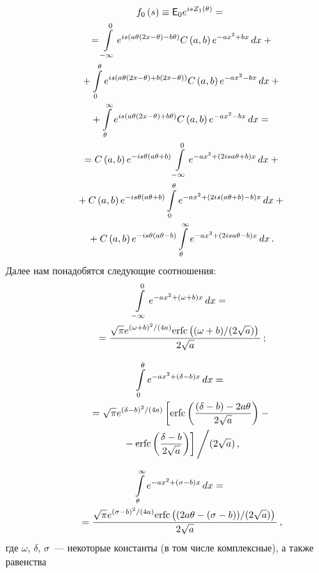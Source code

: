 \begin{multicols}{2}
\begin{multline}
f_{0} \left(s\right)\equiv
{{\sf E}}_{0}e^{isZ_{1}\left(\theta\right)}={}\\
{}= \int\limits_{-\infty}^{0}
e^{is\left(a\theta\left(2x-\theta\right)-b\theta\right)}
C\left(a,b\right)e^{-a x^{2}+bx}\,dx+{}\\
{}
+\int\limits_{0}^{\theta }e^{is\left(a\theta\left(2x
-\theta\right)+b\left(2x-\theta\right)\right)}
C\left(a,b\right)e^{-ax^{2}-bx}\,dx+{}\\
{}+
\int\limits_{\theta }^{\infty }e^{is\left(a\theta
\left(2x-\theta\right)+b\theta \right)}C\left(a,b\right)
e^{-ax^{2}-bx}\,dx={}\\
{}
=C\left(a,b\right)e^{-is\theta\left(a\theta+b\right)}
\int\limits_{-\infty }^{0}e^{-a x^{2}
+\left(2isa\theta+b\right)x}\,dx+{}\\
{}+C\left(a,b\right)
e^{-is\theta\left(a \theta+b\right)}\int\limits_{0}^{\theta }
e^{-a x^{2}+\left(2is\left(a\theta + b
\right)-b\right)x}\,dx+{}\\
{}
+C\left(a,b\right) e^{-is\theta\left(a\theta - b\right)}
\int\limits_{\theta }^{\infty } e^{-a x^{2}
+ \left(2isa\theta - b\right)x}\,dx\,.  
\label{e2.5}
\end{multline}
Далее нам понадобятся следующие соотношения:
\begin{multline}
\int\limits_{-\infty }^{0}e^{-a x^{2}+\left(\omega+b\right)x}\,dx={}\\
{}=
\displaystyle\frac{\displaystyle \sqrt{\pi }e^{\left(\omega+b\right)^{2}/(4a)}
{\mathrm{erfc}}\left((\omega+b)/(2\sqrt{a})\right)\mathstrut}{\displaystyle 2\sqrt{a}\mathstrut}\,; 
\label{e2.6}
\end{multline}
\vspace*{-6pt}

\noindent
\begin{multline}
\int\limits_{0}^{\theta }e^{-a x^{2}+\left(\delta-b\right)x}\,dx ={}\\
{}=
\sqrt{\pi}e^{\left(\delta-b\right)^{2}/(4a)}
\left[{\mathrm{erfc}}\left(\displaystyle\frac{\displaystyle \left(\delta
-b\right)-2a\theta \mathstrut}{\displaystyle {\rm 2}\sqrt{a}\mathstrut}\right)-{}\right.\\
\left.{}-{\mathrm{erfc}}\left(\displaystyle\frac{\displaystyle \delta-b\mathstrut}{\displaystyle {\rm 2}\sqrt{a}\mathstrut}
\right)\right]\Bigg /(2\sqrt{a})\,, \label{e2.7}
\end{multline}
\vspace*{-6pt}

\noindent
\begin{multline}
\int\limits_{\theta }^{\infty }e^{-ax^{2}+\left(\sigma
-b\right)x}\,dx ={}\\
{}=
\displaystyle\frac{\displaystyle \sqrt{\pi}e^{\left(\sigma-
b\right)^{2}/(4a)}{\mathrm{erfc}}\left((2a\theta
-\left(\sigma-b\right))/(2\sqrt{a})
\right)\mathstrut}{\displaystyle 2\sqrt{a}\mathstrut}\,, \label{e2.8}
\end{multline}
где $\omega$, $\delta$, $\sigma $~--- некоторые константы (в том числе комплексные), а также равенства


\end{multicols}
